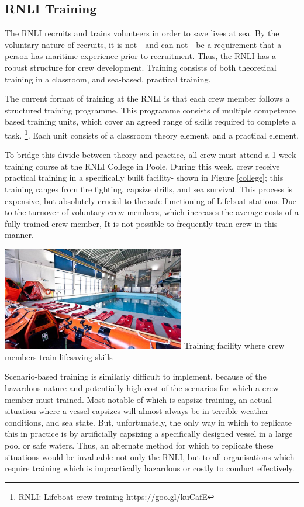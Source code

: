 \documentclass[a4paper, openright, twoside]{book}
\begin{document}
\subsection{RNLI Training} \label{rnli_training}
The RNLI recruits and trains volunteers in order to save lives at sea. By the voluntary nature of recruits, it is not - and can not - be a requirement that a person has maritime experience prior to recruitment. Thus, the RNLI has a robust structure for crew development. Training consists of both theoretical training in a classroom, and sea-based, practical training.

The current format of training at the RNLI is that each crew member follows a structured training programme. This programme consists of multiple competence based training units, which cover an agreed range of skills required to complete a task. \footnote{RNLI: Lifeboat crew training \url{https://goo.gl/kuCafE}}. Each unit consists of a classroom theory element, and a practical element. 

To bridge this divide between theory and practice, all crew must attend a 1-week training course at the RNLI College in Poole. During this week, crew receive practical training in a specifically built facility- shown in Figure \ref{college}; this training ranges from fire fighting, capsize drills, and sea survival. This process is expensive, but absolutely crucial to the safe functioning of Lifeboat stations. Due to the turnover of voluntary crew members, which increases the average costs of a fully trained crew member, It is not possible to frequently train crew in this manner. 

\begin{minipage}{\textwidth}
\centering
\includegraphics[width=0.6\textwidth]{images/rnli_college.jpg}
 {Training facility where crew members train lifesaving skills}
\label{college}
\hfill \break
\end{minipage}


Scenario-based training is similarly difficult to implement, because of the hazardous nature and potentially high cost of the scenarios for which a crew member must trained. Most notable of which is capsize training, an actual situation where a vessel capsizes will almost always be in terrible weather conditions, and sea state. But, unfortunately, the only way in which to replicate this in practice is by artificially capsizing a specifically designed vessel in a large pool or safe waters. Thus, an alternate method for which to replicate these situations would be invaluable not only the RNLI, but to all organisations which require training which is impractically hazardous or costly to conduct effectively. 
\end{document}
